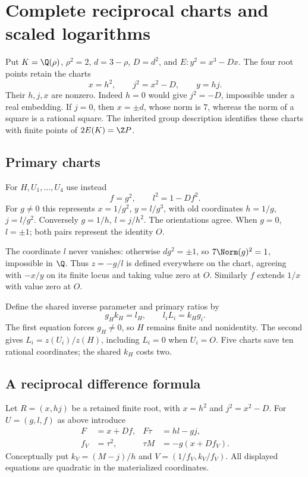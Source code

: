 \section{Complete reciprocal charts and scaled logarithms}

Put $K=\Q(\rho)$, $\rho^2=2$, $d=3-\rho$, $D=d^2$, and
$E:y^2=x^3-Dx$. The four root points retain the charts
\[
 x=h^2,\qquad j^2=x^2-D,\qquad y=hj.
\]
Their $h,j,x$ are nonzero. Indeed $h=0$ would give $j^2=-D$, impossible
under a real embedding. If $j=0$, then $x=\pm d$, whose norm is $7$,
whereas the norm of a square is a rational square. The inherited group
description identifies these charts with finite points of $2E(K)=\Z P$.

\subsection{Primary charts}
For $H,U_1,\ldots,U_4$ use instead
\begin{equation}\label{eq:reciprocal-chart}
 f=g^2,\qquad l^2=1-Df^2.
\end{equation}
For $g\ne0$ this represents $x=1/g^2$, $y=l/g^3$, with old coordinates
$h=1/g$, $j=l/g^2$. Conversely $g=1/h$, $l=j/h^2$. The orientations agree.
When $g=0$, $l=\pm1$; both pairs represent the identity $O$.

The coordinate $l$ never vanishes: otherwise $dg^2=\pm1$, so
$7\Norm(g)^2=1$, impossible in $\Q$. Thus $z=-g/l$ is defined everywhere
on the chart, agreeing with $-x/y$ on its finite locus and taking value zero
at $O$. Similarly $f$ extends $1/x$ with value zero at $O$.

Define the shared inverse parameter and primary ratios by
\[
 g_Hk_H=l_H,\qquad l_iL_i=k_Hg_i.
\]
The first equation forces $g_H\ne0$, so $H$ remains finite and nonidentity.
The second gives $L_i=z(U_i)/z(H)$, including $L_i=0$ when $U_i=O$.
Five charts save ten rational coordinates; the shared $k_H$ costs two.

\subsection{A reciprocal difference formula}
Let $R=(x,hj)$ be a retained finite root, with $x=h^2$ and $j^2=x^2-D$.
For $U=(g,l,f)$ as above introduce
\begin{equation}\label{eq:complete-difference}
 \begin{aligned}
 F&=x+Df, &F\tau&=hl-gj,\\
 f_V&=\tau^2, &\tau M&=-g(x+Df_V).
 \end{aligned}
\end{equation}
Conceptually put $k_V=(M-j)/h$ and
$V=(1/f_V,k_V/f_V)$. All displayed equations are quadratic in the
materialized coordinates.


